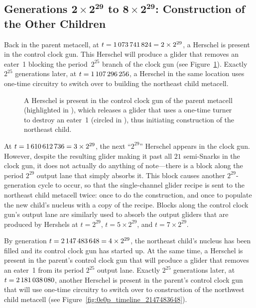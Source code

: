 \subsection{Generations $\mathbf{2 \times 2^{29}}$ to $\mathbf{8 \times 2^{29}}$: Construction of the Other Children}\label{sec:0e0p_timeline_other_child}

Back in the parent metacell, at $t = 1{\,}073{\,}741{\,}824 = 2 \times 2^{29}$, a Herschel is present in the control clock gun. This Herschel will produce a glider that removes an eater~1 blocking the period~$2^{25}$ branch of the clock gun (see Figure~\ref{fig:0e0p_timeline_1073741824}). Exactly $2^{25}$ generations later, at $t = 1{\,}107{\,}296{\,}256$, a Herschel in the same location uses one-time circuitry to switch over to building the northeast child metacell.

\begin{figure}[!htb]
	\centering
	\caption{A Herschel is present in the control clock gun of the parent metacell (highlighted in ), which releases a glider that uses a one-time turner to destroy an eater~1 (circled in ), thus initiating construction of the northeast child.}
	\label{fig:0e0p_timeline_1073741824}
\end{figure}

At $t = 1{\,}610{\,}612{\,}736 = 3 \times 2^{29}$, the next ``$2^{29}$'' Herschel appears in the clock gun. However, despite the resulting glider making it past all $21$ semi-Snarks in the clock gun, it does not actually do anything of note---there is a block along the period $2^{29}$ output lane that simply absorbs it. This block causes another $2^{29}$-generation cycle to occur, so that the single-channel glider recipe is sent to the northeast child metacell twice: once to do the construction, and once to populate the new child's nucleus with a copy of the recipe. Blocks along the control clock gun's output lane are similarly used to absorb the output gliders that are produced by Hershels at $t = 2^{29}$, $t = 5 \times 2^{29}$, and $t = 7 \times 2^{29}$.

By generation $t = 2{\,}147{\,}483{\,}648 = 4 \times 2^{29}$, the northeast child's nucleus has been filled and its control clock gun has started up. At the same time, a Herschel is present in the parent's control clock gun that will produce a glider that removes an eater~1 from its period $2^{25}$ output lane. Exactly $2^{25}$ generations later, at $t = 2{\,}181{\,}038{\,}080$, another Herschel is present in the parent's control clock gun that will use one-time circuitry to switch over to construction of the northwest child metacell (see Figure~\ref{fig:0e0p_timeline_2147483648}).

